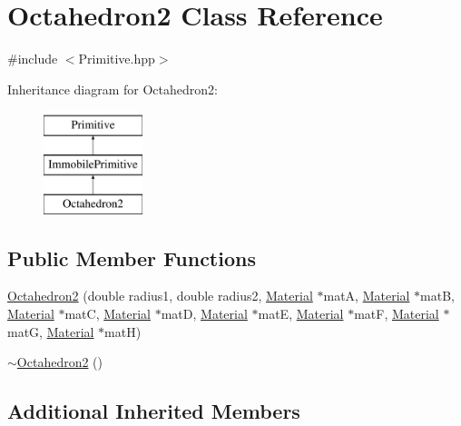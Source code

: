 \hypertarget{class_octahedron2}{\section{Octahedron2 Class Reference}
\label{class_octahedron2}
}


{\ttfamily \#include $<$Primitive.\-hpp$>$}

Inheritance diagram for Octahedron2\-:\begin{figure}[H]
\begin{center}
\leavevmode
\includegraphics[height=3.000000cm]{class_octahedron2}
\end{center}
\end{figure}
\subsection*{Public Member Functions}
\begin{DoxyCompactItemize}
\item 
\hyperlink{class_octahedron2_ae61ff61ed3a6976d64ebad69122c5b17}{Octahedron2} (double radius1, double radius2, \hyperlink{class_material}{Material} $\ast$mat\-A, \hyperlink{class_material}{Material} $\ast$mat\-B, \hyperlink{class_material}{Material} $\ast$mat\-C, \hyperlink{class_material}{Material} $\ast$mat\-D, \hyperlink{class_material}{Material} $\ast$mat\-E, \hyperlink{class_material}{Material} $\ast$mat\-F, \hyperlink{class_material}{Material} $\ast$mat\-G, \hyperlink{class_material}{Material} $\ast$mat\-H)
\item 
\hyperlink{class_octahedron2_a5298f4c72c353def01fb6d35c031bbdd}{$\sim$\-Octahedron2} ()
\end{DoxyCompactItemize}
\subsection*{Additional Inherited Members}


